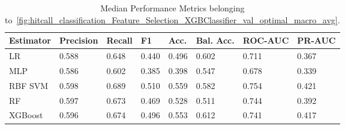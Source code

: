 \begin{longtable}{llllllll}
\caption{Median Performance Metrics belonging to~\ref{fig:hitcall_classification_Feature_Selection_XGBClassifier_val_optimal_macro_avg}.}\label{tab:table:hitcall_classification_feature_selection_xgbclassifier_val_optimal_macro_avg}\\
\toprule
\midrule
\small Estimator & \small Precision & \small Recall & \small F1 & \small Acc. & \small Bal. Acc. & \small ROC-AUC & \small PR-AUC\\
\hline
LR & 0.588 & 0.648 & 0.440 & 0.496 & 0.602 & 0.711 & 0.367\\
MLP & 0.586 & 0.602 & 0.385 & 0.398 & 0.547 & 0.678 & 0.339\\
RBF SVM & 0.598 & 0.689 & 0.510 & 0.559 & 0.582 & 0.754 & 0.421\\
RF & 0.597 & 0.673 & 0.469 & 0.528 & 0.511 & 0.744 & 0.392\\
XGBoost & 0.596 & 0.674 & 0.496 & 0.553 & 0.612 & 0.741 & 0.417\\
\bottomrule
\end{longtable}